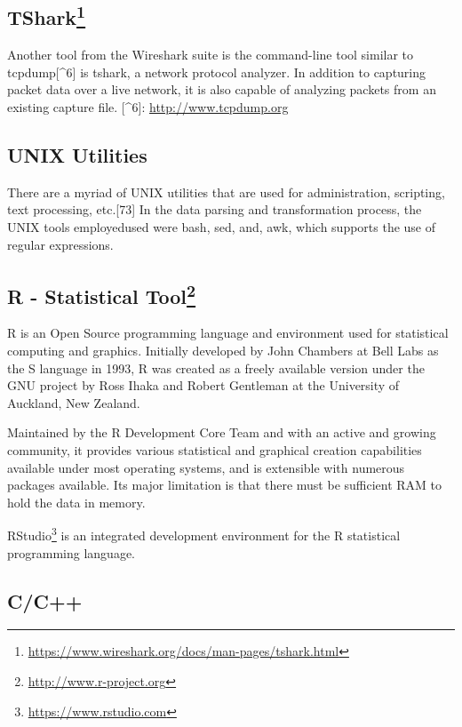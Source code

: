 \documentclass[11pt,]{article}
\let\rmarkdownfootnote\footnote%
\def\footnote{\protect\rmarkdownfootnote}
\begin{document}
\subsection[TShark]{TShark\footnote{\url{https://www.wireshark.org/docs/man-pages/tshark.html}}}\label{tshark5}

Another tool from the Wireshark suite is the command-line tool similar
to tcpdump{[}\^{}6{]} is tshark, a network protocol analyzer. In
addition to capturing packet data over a live network, it is also
capable of analyzing packets from an existing capture file. {[}\^{}6{]}:
\url{http://www.tcpdump.org}

\subsection{UNIX Utilities}\label{unix-utilities}

There are a myriad of UNIX utilities that are used for administration,
scripting, text processing, etc.{[}73{]} In the data parsing and
transformation process, the UNIX tools employedused were bash, sed, and,
awk, which supports the use of regular expressions.

\subsection[R - Statistical Tool]{R - Statistical Tool\footnote{\url{http://www.r-project.org}}}\label{r---statistical-tool7}

R is an Open Source programming language and environment used for
statistical computing and graphics. Initially developed by John Chambers
at Bell Labs as the S language in 1993, R was created as a freely
available version under the GNU project by Ross Ihaka and Robert
Gentleman at the University of Auckland, New Zealand.

Maintained by the R Development Core Team and with an active and growing
community, it provides various statistical and graphical creation
capabilities available under most operating systems, and is extensible
with numerous packages available. Its major limitation is that there
must be sufficient RAM to hold the data in memory.

RStudio\footnote{\url{https://www.rstudio.com}} is an integrated
development environment for the R statistical programming language.

\subsection{C/C++}\label{cc}
\end{document}
